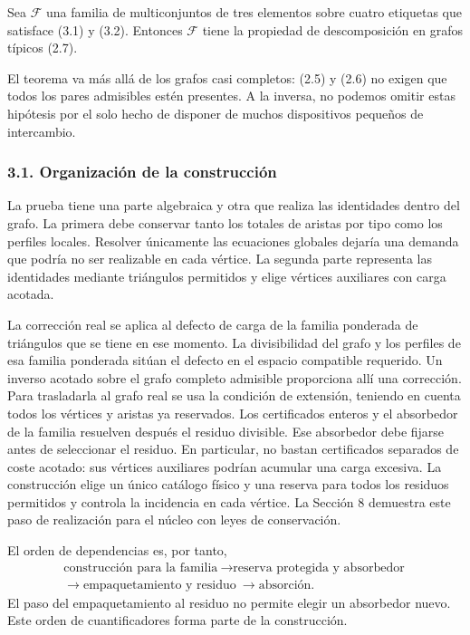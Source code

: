 \documentclass[spanish,11pt,a4paper]{article}
\begin{document}
Sea \(\mathcal F\) una familia de multiconjuntos de tres elementos sobre cuatro etiquetas que satisface (3.1) y (3.2). Entonces \(\mathcal F\) tiene la propiedad de descomposición en grafos típicos (2.7).

El teorema va más allá de los grafos casi completos: (2.5) y (2.6) no exigen que todos los pares admisibles estén presentes. A la inversa, no podemos omitir estas hipótesis por el solo hecho de disponer de muchos dispositivos pequeños de intercambio.

\subsubsection{3.1. Organización de la construcción}\label{organizaciuxf3n-de-la-construcciuxf3n}

La prueba tiene una parte algebraica y otra que realiza las identidades dentro del grafo. La primera debe conservar tanto los totales de aristas por tipo como los perfiles locales. Resolver únicamente las ecuaciones globales dejaría una demanda que podría no ser realizable en cada vértice. La segunda parte representa las identidades mediante triángulos permitidos y elige vértices auxiliares con carga acotada.

La corrección real se aplica al defecto de carga de la familia ponderada de triángulos que se tiene en ese momento. La divisibilidad del grafo y los perfiles de esa familia ponderada sitúan el defecto en el espacio compatible requerido. Un inverso acotado sobre el grafo completo admisible proporciona allí una corrección. Para trasladarla al grafo real se usa la condición de extensión, teniendo en cuenta todos los vértices y aristas ya reservados. Los certificados enteros y el absorbedor de la familia resuelven después el residuo divisible. Ese absorbedor debe fijarse antes de seleccionar el residuo. En particular, no bastan certificados separados de coste acotado: sus vértices auxiliares podrían acumular una carga excesiva. La construcción elige un único catálogo físico y una reserva para todos los residuos permitidos y controla la incidencia en cada vértice. La Sección 8 demuestra este paso de realización para el núcleo con leyes de conservación.

El orden de dependencias es, por tanto, \[\begin{gathered}\text{construcción para la familia}\ \longrightarrow
\text{reserva protegida y absorbedor}\ \\\longrightarrow
\text{empaquetamiento y residuo}\ \longrightarrow
\text{absorción}.
\end{gathered}\tag{3.3}\] El paso del empaquetamiento al residuo no permite elegir un absorbedor nuevo. Este orden de cuantificadores forma parte de la construcción.
\end{document}
